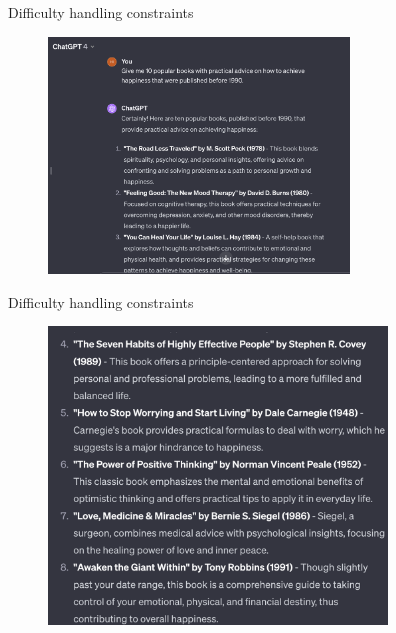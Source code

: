 \begin{vbframe}{Difficulty handling constraints}

\vfill

\begin{figure}
\centering
\includegraphics[width = 8cm]{figure/10happy1.png}
\end{figure}


\vfill

\end{vbframe}
\begin{vbframe}{Difficulty handling constraints}

\vfill

\begin{figure}
\centering
\includegraphics[width = 9cm]{figure/10happy2.png}
\end{figure}


\vfill

\end{vbframe}

